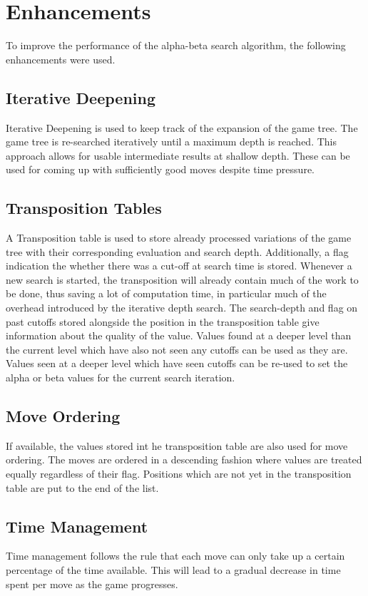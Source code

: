 \section{Enhancements}

To improve the performance of the alpha-beta search algorithm, the following enhancements were used.

\subsection{Iterative Deepening}
Iterative Deepening is used to keep track of the expansion of the game tree. The game tree is re-searched iteratively until a maximum depth is reached. This approach allows for usable intermediate results at shallow depth. These can be used for coming up with sufficiently good moves despite time pressure.

\subsection{Transposition Tables}

A Transposition table is used to store already processed variations of the game tree with their corresponding evaluation and search depth. Additionally, a flag indication the whether there was a cut-off at search time is stored. Whenever a new search is started, the transposition will already contain much of the work to be done, thus saving a lot of computation time, in particular much of the overhead introduced by the iterative depth search. The search-depth and flag on past cutoffs stored alongside the position in the transposition table give information about the quality of the value. Values found at a deeper level than the current level which have also not seen any cutoffs can be used as they are. Values seen at a deeper level which have seen cutoffs can be re-used to set the alpha or beta values for the current search iteration.

\subsection{Move Ordering}
If available, the values stored int he transposition table are also used for move ordering. The moves are ordered in a descending fashion where values are treated equally regardless of their flag. Positions which are not yet in the transposition table are put to the end of the list.

\subsection{Time Management}
Time management follows the rule that each move can only take up a certain percentage of the time available. This will lead to a gradual decrease in time spent per move as the game progresses.


